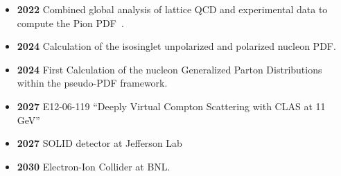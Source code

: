 \documentclass[12pt,hyperpdf]{article}
\begin{document}
\begin{itemize}
\begin{itemize}
   \item{\bf 2022} Combined global analysis of lattice QCD and
     experimental data to compute the Pion PDF~\cite{JeffersonLabAngularMomentumJAM:2022aix}.
   \item{\bf 2024} Calculation of the isosinglet unpolarized and
     polarized nucleon PDF.
   \item{\bf 2024} First Calculation of the nucleon Generalized Parton
     Distributions within the pseudo-PDF framework.
   \item{\bf 2027} E12-06-119 ``Deeply Virtual Compton Scattering with
     CLAS at 11 GeV''
   \item{\bf 2027} SOLID detector at Jefferson Lab
   \item{\bf 2030} Electron-Ion Collider at BNL.
\end{itemize}
\end{itemize}


\end{document}
